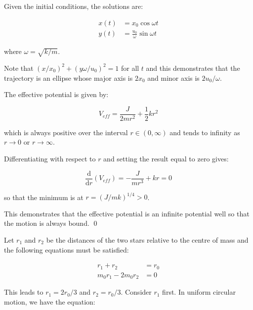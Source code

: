 \documentclass[12pt]{article}
\begin{document}
Given the initial conditions, the solutions are:

\begin{equation}
\begin{split}
    x(t) &= x_{0} \cos{\omega t} \\
    y(t) &= \frac{u_{0}}{\omega} \sin{\omega t}
\end{split}
\end{equation}

where $\omega = \sqrt{k/m}$.

Note that $(x/x_{0})^{2} + (y \omega/u_{0})^{2} = 1$ for all $t$ and this demonstrates that the trajectory is an ellipse whose major axis is $2x_{0}$ and minor axis is $2u_{0}/\omega$.

The effective potential is given by:

\begin{equation}
    V_{eff} = \frac{J}{2mr^{2}} + \frac{1}{2}kr^{2}
\end{equation}

which is always positive over the interval $r \in (0, \infty)$ and tends to infinity as $r \to 0$ or $r \to \infty$.

Differentiating with respect to $r$ and setting the result equal to zero gives:

\begin{equation}
    \frac{\mathrm{d}}{\mathrm{d}r} (V_{eff}) = -\frac{J}{mr^{3}} + kr = 0
\end{equation}

so that the minimum is at $r = (J/mk)^{1/4} > 0$.

This demonstrates that the effective potential is an infinite potential well so that the motion is always bound.
\qed



Let $r_{1}$ and $r_{2}$ be the distances of the two stars relative to the centre of mass and the following equations must be satisfied:

\begin{equation}
\begin{split}
    r_{1} + r_{2} &= r_{0} \\
    m_{0}r_{1} - 2m_{0}r_{2} &= 0
\end{split}
\end{equation}

This leads to $r_{1} = 2r_{0}/3$ and $r_{2} = r_{0}/3$. Consider $r_{1}$ first. In uniform circular motion, we have the equation:
\end{document}
